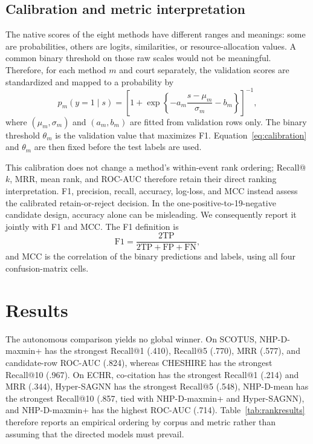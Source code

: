 \documentclass{svproc}
\begin{document}
\subsection{Calibration and metric interpretation}

The native scores of the eight methods have different ranges and meanings: some are probabilities, others are logits, similarities, or resource-allocation values. A common binary threshold on those raw scales would not be meaningful. Therefore, for each method $m$ and court separately, the validation scores are standardized and mapped to a probability by
\begin{equation}
p_m(y=1\mid s)=\left[1+\exp\left\{-a_m\frac{s-\mu_m}{\sigma_m}-b_m\right\}\right]^{-1},
\label{eq:calibration}
\end{equation}
where $(\mu_m,\sigma_m)$ and $(a_m,b_m)$ are fitted from validation rows only. The binary threshold $\theta_m$ is the validation value that maximizes F1. Equation~\eqref{eq:calibration} and $\theta_m$ are then fixed before the test labels are used.

This calibration does not change a method's within-event rank ordering; Recall@$k$, MRR, mean rank, and ROC-AUC therefore retain their direct ranking interpretation. F1, precision, recall, accuracy, log-loss, and MCC instead assess the calibrated retain-or-reject decision. In the one-positive-to-19-negative candidate design, accuracy alone can be misleading. We consequently report it jointly with F1 and MCC. The F1 definition is
\begin{equation}
\mathrm{F1}=\frac{2\mathrm{TP}}{2\mathrm{TP}+\mathrm{FP}+\mathrm{FN}},
\label{eq:binarymetrics}
\end{equation}
and MCC is the correlation of the binary predictions and labels, using all four confusion-matrix cells.

\section{Results}
\label{sec:results}

The autonomous comparison yields no global winner. On SCOTUS, NHP-D-maxmin+ has the strongest Recall@1 (.410), Recall@5 (.770), MRR (.577), and candidate-row ROC-AUC (.824), whereas CHESHIRE has the strongest Recall@10 (.967). On ECHR, co-citation has the strongest Recall@1 (.214) and MRR (.344), Hyper-SAGNN has the strongest Recall@5 (.548), NHP-D-mean has the strongest Recall@10 (.857, tied with NHP-D-maxmin+ and Hyper-SAGNN), and NHP-D-maxmin+ has the highest ROC-AUC (.714). Table~\ref{tab:rankresults} therefore reports an empirical ordering by corpus and metric rather than assuming that the directed models must prevail.
\end{document}
